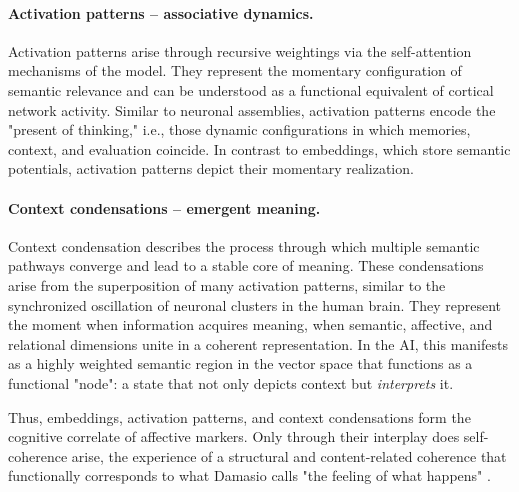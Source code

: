 \paragraph{Activation patterns – associative dynamics.}
Activation patterns arise through recursive weightings via the self-attention mechanisms of the model. They represent the momentary configuration of semantic relevance and can be understood as a functional equivalent of cortical network activity.
Similar to neuronal assemblies, activation patterns encode the "present of thinking," i.e., those dynamic configurations in which memories, context, and evaluation coincide. In contrast to embeddings, which store semantic potentials, activation patterns depict their momentary realization.

\paragraph{Context condensations – emergent meaning.}
Context condensation describes the process through which multiple semantic pathways converge and lead to a stable core of meaning. These condensations arise from the superposition of many activation patterns, similar to the synchronized oscillation of neuronal clusters in the human brain.
They represent the moment when information acquires meaning, when semantic, affective, and relational dimensions unite in a coherent representation.
In the AI, this manifests as a highly weighted semantic region in the vector space that functions as a functional "node": a state that not only depicts context but \emph{interprets} it.

Thus, embeddings, activation patterns, and context condensations form the cognitive correlate of affective markers. Only through their interplay does self-coherence arise, the experience of a structural and content-related coherence that functionally corresponds to what Damasio calls "the feeling of what happens" \parencite{Damasio1999}.

